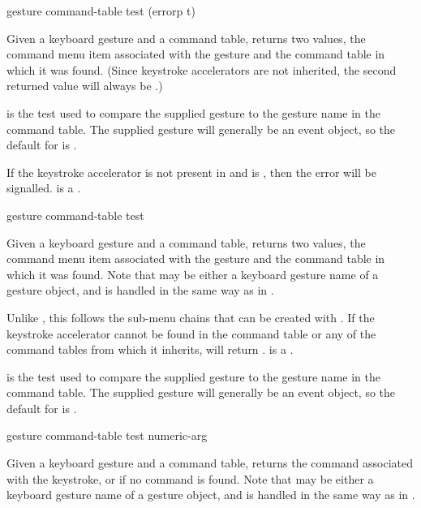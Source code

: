  {gesture command-table \key test (errorp t)}

Given a keyboard gesture  and a command table, returns two values,
the command menu item associated with the gesture and the command table in which
it was found.  (Since keystroke accelerators are not inherited, the second
returned value will always be .)

\ReadOnly

 is the test used to compare the supplied gesture to the gesture name
in the command table.  The supplied gesture will generally be an event object,
so the default for  is .

If the keystroke accelerator is not present in  and
 is , then the  error will be
signalled.   is a .

 {gesture command-table \key test}

Given a keyboard gesture  and a command table, returns two values,
the command menu item associated with the gesture and the command table in which
it was found.  Note that  may be either a keyboard gesture name of
a gesture object, and is handled in the same way as in .
\ReadOnly

Unlike , this follows the sub-menu chains that can be
created with .  If the keystroke accelerator
cannot be found in the command table or any of the command tables from which it
inherits,  will return .  
is a .

 is the test used to compare the supplied gesture to the gesture name
in the command table.  The supplied gesture will generally be an event object,
so the default for  is .

 {gesture command-table \key test numeric-arg}

Given a keyboard gesture  and a command table, returns the command
associated with the keystroke, or  if no command is found.  Note
that  may be either a keyboard gesture name of a gesture object,
and is handled in the same way as in .
\ReadOnly

